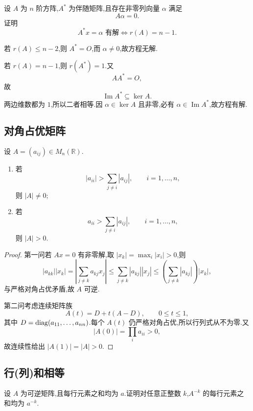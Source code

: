 \begin{example}
设 $A$ 为 $n$ 阶方阵,$A^*$ 为伴随矩阵,且存在非零列向量 $\alpha$ 满足
\[
A\alpha=0.
\]
证明
\[
A^*x=\alpha\text{ 有解}
\iff
r(A)=n-1.
\]
\end{example}
\exampleblank

\begin{solution}
若 $r(A)\leq n-2$,则 $A^*=O$,而 $\alpha\neq0$,故方程无解.

若 $r(A)=n-1$,则 $r(A^*)=1$.又
\[
AA^*=O,
\]
故
\[
\operatorname{Im}A^*\subseteq\ker A.
\]
两边维数都为 $1$,所以二者相等.因 $\alpha\in\ker A$ 且非零,必有 $\alpha\in\operatorname{Im}A^*$,故方程有解.
\end{solution}

\subsection{对角占优矩阵}

\begin{proposition}[\markstar]
设 $A=(a_{ij})\in M_n(\mathbb{R})$.
\begin{enumerate}
  \item 若
  \[
  |a_{ii}|>\sum\limits_{j\neq i}|a_{ij}|,
  \qquad i=1,\ldots,n,
  \]
  则 $|A|\neq0$;
  \item 若
  \[
  a_{ii}>\sum\limits_{j\neq i}|a_{ij}|,
  \qquad i=1,\ldots,n,
  \]
  则 $|A|>0$.
\end{enumerate}
\end{proposition}

\begin{proof}
第一问若 $Ax=0$ 有非零解,取 $|x_k|=\max_i|x_i|>0$,则
\[
|a_{kk}||x_k|
=\left|\sum_{j\neq k}a_{kj}x_j\right|
\leq\sum_{j\neq k}|a_{kj}||x_j|
\leq\left(\sum_{j\neq k}|a_{kj}|\right)|x_k|,
\]
与严格对角占优矛盾,故 $A$ 可逆.

第二问考虑连续矩阵族
\[
A(t)=D+t(A-D),\qquad 0\leq t\leq1,
\]
其中 $D=\operatorname{diag}(a_{11},\ldots,a_{nn})$.每个 $A(t)$ 仍严格对角占优,所以行列式从不为零.又
\[
|A(0)|=\prod_i a_{ii}>0,
\]
故连续性给出 $|A(1)|=|A|>0$.
\end{proof}

\subsection{行(列)和相等}

\begin{example}
设 $A$ 为可逆矩阵,且每行元素之和均为 $a$.证明对任意正整数 $k$,$A^{-k}$ 的每行元素之和均为 $a^{-k}$.
\end{example}
\exampleblank

